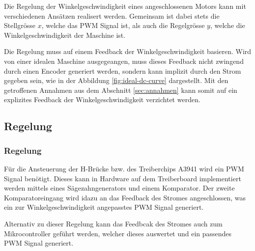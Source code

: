Die Regelung der Winkelgeschwindigkeit eines angeschlossenen Motors kann
mit verschiedenen Ansätzen realisert werden. Gemeinsam ist dabei stets die
Stellgrösse $x$, welche das PWM Signal ist, als auch die Regelgrösse $y$,
welche die Winkelgeschwindigkeit der Maschine ist.

Die Regelung muss auf einem Feedback der Winkelgeschwindigkeit basieren.
Wird von einer idealen Maschine ausgegeangen, muss dieses Feedback nicht
zwingend durch einen Encoder generiert werden, sondern kann implizit durch
den Strom gegeben sein, wie in der Abbildung \ref{fig:ideal-dc-curve}
dargestellt. Mit den getroffenen Annahmen aus dem Abschnitt
\ref{sec:annahmen} kann somit auf ein explizites Feedback der
Winkelgeschwindigkeit verzichtet werden. 

\ifSTANDALONE
\subsection{Regelung}
\fi
\ifEMBED
\subsubsection{Regelung}
\fi
Für die Ansteuerung der H-Brücke bzw. des Treiberchips A3941 wird ein PWM
Signal benötigt. Dieses kann in Hardware auf dem Treiberboard implementiert
werden mittels eines Sägezahngenerators und einem Komparator. Der zweite
Komparatoreingang wird idazu an das Feedback des Stromes angeschlossen, was
ein zur Winkelgeschwindigkeit angepasstes PWM Signal generiert.

Alternativ zu dieser Regelung kann das Feedbcak des Stromes auch zum
Mikrocontroller geführt werden, welcher dieses auswertet und ein passendes
PWM Signal generiert.

